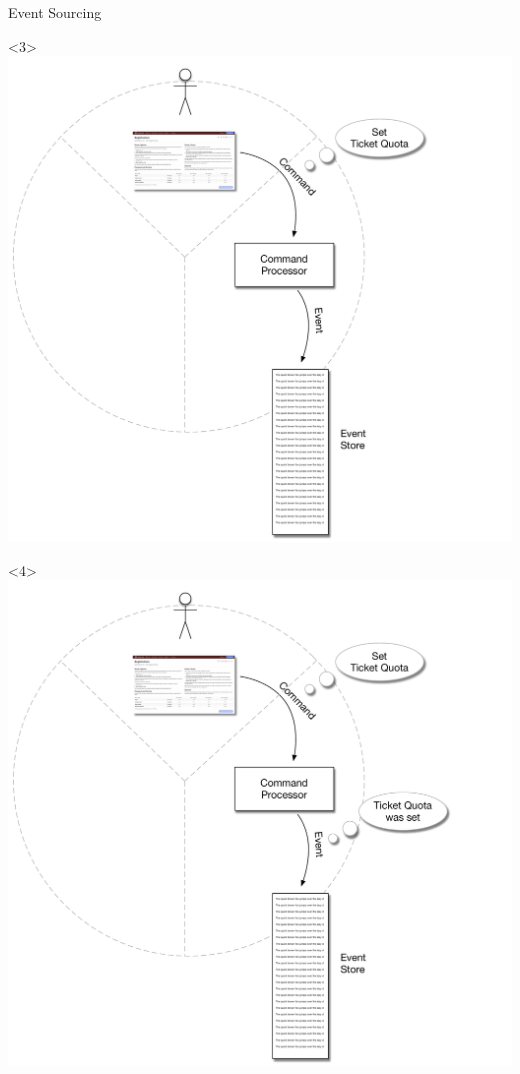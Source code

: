 \begin{frame}[fragile]{Event Sourcing}
\begin{onlyenv}
\end{onlyenv}
\begin{onlyenv}<3>
\includegraphics[width=\WIDTH]{../EventSourcing2.pdf} %
\end{onlyenv}
\begin{onlyenv}<4>
\includegraphics[width=\WIDTH]{../EventSourcing2_1.pdf} %

\end{onlyenv}
\end{frame}
